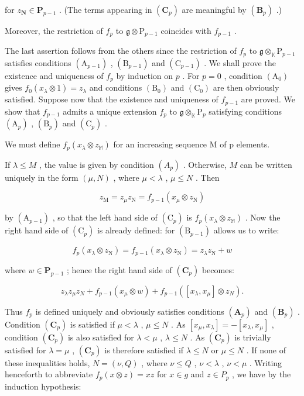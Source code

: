 for \(z_{\mathbf{N}} \in \mathbf{P}_{p-1}\) . (The terms appearing in \((\mathbf{C}_p)\) are meaningful by \((\mathbf{B}_p)\) .)

Moreover, the restriction of \(f_{p}\) to \(\mathfrak{g} \otimes \mathrm{P}_{p-1}\) coincides with \(f_{p-1}\) .

The last assertion follows from the others since the restriction of \(f_{p}\) to \(\mathfrak{g} \otimes_{\mathbb{K}} \mathrm{P}_{p-1}\) satisfies conditions \((\mathrm{A}_{p-1})\) , \((\mathrm{B}_{p-1})\) and \((\mathrm{C}_{p-1})\) . We shall prove the existence and uniqueness of \(f_{p}\) by induction on \(p\) . For \(p = 0\) , condition \((\mathrm{A}_0)\) gives \(f_0(x_\lambda \otimes 1) = z_\lambda\) and conditions \((\mathrm{B}_0)\) and \((\mathrm{C}_0)\) are then obviously satisfied. Suppose now that the existence and uniqueness of \(f_{p-1}\) are proved. We show that \(f_{p-1}\) admits a unique extension \(f_{p}\) to \(\mathfrak{g} \otimes_{\mathbb{K}} \mathrm{P}_{p}\) satisfying conditions \((\mathrm{A}_{p})\) , \((\mathrm{B}_{p})\) and \((\mathrm{C}_{p})\) .

We must define \(f_{p}(x_{\lambda} \otimes z_{\mathbb{M}})\) for an increasing sequence M of p elements.

If \(\lambda \leqslant M\) , the value is given by condition \((A_p)\) . Otherwise, \(M\) can be written uniquely in the form \((\mu, N)\) , where \(\mu < \lambda\) , \(\mu \leqslant N\) . Then

\[
z _ {\mathrm{M}} = z _ {\mu} z _ {\mathrm{N}} = f _ {p - 1} (x _ {\mu} \otimes z _ {\mathrm{N}})
\]

by \((\mathrm{A}_{p - 1})\) , so that the left hand side of \((\mathrm{C}_p)\) is \(f_{p}(x_{\lambda}\otimes z_{\mathbb{M}})\) . Now the right hand side of \((\mathrm{C}_p)\) is already defined: for \((\mathrm{B}_{p - 1})\) allows us to write:

\[
f _ {p} (x _ {\lambda} \otimes z _ {\mathrm{N}}) = f _ {p - 1} (x _ {\lambda} \otimes z _ {\mathrm{N}}) = z _ {\lambda} z _ {\mathrm{N}} + w
\]

where \(w \in \mathbf{P}_{p-1}\) ; hence the right hand side of \((\mathbf{C}_p)\) becomes:

\[
z _ {\lambda} z _ {\mu} z _ {N} + f _ {p - 1} (x _ {\mu} \otimes w) + f _ {p - 1} ([ x _ {\lambda}, x _ {\mu} ] \otimes z _ {N}).
\]

Thus \(f_{p}\) is defined uniquely and obviously satisfies conditions \((\mathbf{A}_{p})\) and \((\mathbf{B}_{p})\) . Condition \((\mathbf{C}_{p})\) is satisfied if \(\mu < \lambda\) , \(\mu \leqslant N\) . As \([x_{\mu}, x_{\lambda}] = -[x_{\lambda}, x_{\mu}]\) , condition \((\mathbf{C}_{p})\) is also satisfied for \(\lambda < \mu\) , \(\lambda \leqslant N\) . As \((\mathbf{C}_{p})\) is trivially satisfied for \(\lambda = \mu\) , \((\mathbf{C}_{p})\) is therefore satisfied if \(\lambda \leqslant N\) or \(\mu \leqslant N\) . If none of these inequalities holds, \(N = (\nu, Q)\) , where \(\nu \leqslant Q\) , \(\nu < \lambda\) , \(\nu < \mu\) . Writing henceforth to abbreviate \(f_{p}(x \otimes z) = xz\) for \(x \in g\) and \(z \in P_{p}\) , we have by the induction hypothesis:

